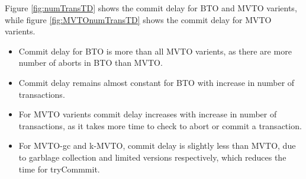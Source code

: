 \documentclass[12pt]{article}
\begin{document}
Figure \ref{fig:numTransTD} shows the commit delay for BTO and MVTO varients, while figure \ref{fig:MVTOnumTransTD} shows the commit delay for MVTO varients.
\begin{itemize}
    \item Commit delay for BTO is more than all MVTO varients, as there are more number of aborts in BTO than MVTO.
    \item Commit delay remains almost constant for BTO with increase in number of transactions.
    \item For MVTO varients commit delay increases with increase in number of transactions, as it takes more time to check to abort or commit a transaction.
    \item For MVTO-gc and k-MVTO, commit delay is slightly less than MVTO, due to garblage collection and limited versions respectively, which reduces the time for tryCommmit.
\end{itemize}
\end{document}
